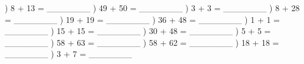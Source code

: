 \documentclass{article}%
\begin{document}
\newline%
) 8 + 13 = \_\_\_\_\_\_\_%
\newline%
\newline%
) 49 + 50 = \_\_\_\_\_\_\_%
\newline%
\newline%
) 3 + 3 = \_\_\_\_\_\_\_%
\newline%
\newline%
) 8 + 28 = \_\_\_\_\_\_\_%
\newline%
\newline%
) 19 + 19 = \_\_\_\_\_\_\_%
\newline%
\newline%
) 36 + 48 = \_\_\_\_\_\_\_%
\newline%
\newline%
) 1 + 1 = \_\_\_\_\_\_\_%
\newline%
\newline%
) 15 + 15 = \_\_\_\_\_\_\_%
\newline%
\newline%
) 30 + 48 = \_\_\_\_\_\_\_%
\newline%
\newline%
) 5 + 5 = \_\_\_\_\_\_\_%
\newline%
\newline%
) 58 + 63 = \_\_\_\_\_\_\_%
\newline%
\newline%
) 58 + 62 = \_\_\_\_\_\_\_%
\newline%
\newline%
) 18 + 18 = \_\_\_\_\_\_\_%
\newline%
\newline%
) 3 + 7 = \_\_\_\_\_\_\_%
\newline%
\newline%
\newline%
\end{document}
